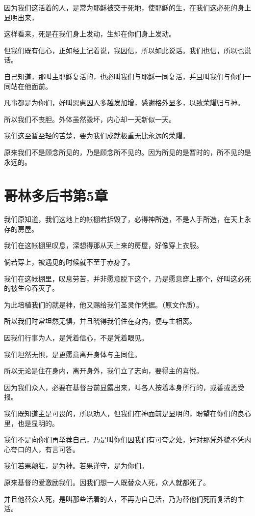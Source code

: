 \documentclass[12pt,oneside]{book}
\begin{document}
因为我们这活着的人，是常为耶稣被交于死地，使耶稣的生，在我们这必死的身上显明出来，

这样看来，死是在我们身上发动，生却在你们身上发动。

但我们既有信心，正如经上记着说，我因信，所以如此说话。我们也信，所以也说话。

自己知道，那叫主耶稣复活的，也必叫我们与耶稣一同复活，并且叫我们与你们一同站在他面前。

凡事都是为你们，好叫恩惠因人多越发加增，感谢格外显多，以致荣耀归与神。

所以我们不丧胆。外体虽然毁坏，内心却一天新似一天。

我们这至暂至轻的苦楚，要为我们成就极重无比永远的荣耀。

原来我们不是顾念所见的，乃是顾念所不见的。因为所见的是暂时的，所不见的是永远的。

\chapter{哥林多后书第5章}
我们原知道，我们这地上的帐棚若拆毁了，必得神所造，不是人手所造，在天上永存的房屋。

我们在这帐棚里叹息，深想得那从天上来的房屋，好像穿上衣服。

倘若穿上，被遇见的时候就不至于赤身了。

我们在这帐棚里，叹息劳苦，并非愿意脱下这个，乃是愿意穿上那个，好叫这必死的被生命吞灭了。

为此培植我们的就是神，他又赐给我们圣灵作凭据。（原文作质）。

所以我们时常坦然无惧，并且晓得我们住在身内，便与主相离。

因我们行事为人，是凭着信心，不是凭着眼见。

我们坦然无惧，是更愿意离开身体与主同住。

所以无论是住在身内，离开身外，我们立了志向，要得主的喜悦。

因为我们众人，必要在基督台前显露出来，叫各人按着本身所行的，或善或恶受报。

我们既知道主是可畏的，所以劝人，但我们在神面前是显明的，盼望在你们的良心里，也是显明的。

我们不是向你们再举荐自己，乃是叫你们因我们有可夸之处，好对那凭外貌不凭内心夸口的人，有言可答。

我们若果颠狂，是为神。若果谨守，是为你们。

原来基督的爱激励我们。因我们想一人既替众人死，众人就都死了。

并且他替众人死，是叫那些活着的人，不再为自己活，乃为替他们死而复活的主活。
\end{document}
